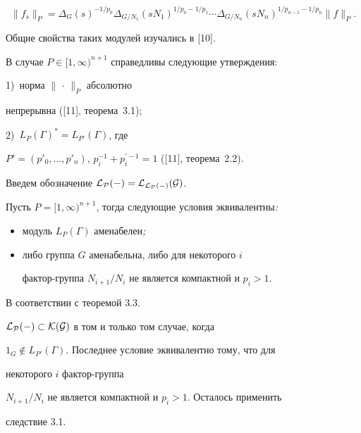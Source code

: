 $$


\|f_s\|_P=\Delta_G(s)^{-1/p_0}\Delta_{G/N_1}


(sN_1)^{1/p_0-1/p_1}\dotsb\Delta_{G/N_n}


(sN_n)^{1/p_{n-1}-1/p_n}\|f\|_P.


$$


Общие свойства таких модулей изучались в [10].





В случае $P\in[1,\infty)^{n+1}$ справедливы следующие утверждения:


1)~норма $\|\,\cdot\,\|_P$ абсолютно


непрерывна ([11], теорема~3.1);


2)~$L_P(\Gamma)^*=L_{P'}(\Gamma)$, где


$P'=(p'_0,\dotsc,p'_n)$, $p^{-1}_i+p_i^{\prime-1}=1$ ([11], теорема~2.2).





Введем обозначение $\cal L_P(\Gamma)=\cal L_{L_P(\Gamma)}(G)$.





\begin{thms}


Пусть $P=[1,\infty)^{n+1}$, тогда следующие условия эквивалентны{\em :}


\begin{itemize}


\item[1)] модуль $L_P(\Gamma)$ аменабелен{\em ;}


\item[2)] либо группа $G$ аменабельна, либо для некоторого $i$


фактор-группа $N_{i+1}/N_i$ не является компактной и $p_i>1$.


\end{itemize}


\end{thms}





\begin{pf}


В соответствии с теоремой 3.3.\;


$\cal L_P(\Gamma)\subset\cal K(G)$ в том и только том случае, когда


$1_G\notin L_{P'}(\Gamma)$. Последнее условие эквивалентно тому, что для


некоторого $i$ фактор-группа


$N_{i+1}/N_i$ не является компактной и $p_i>1$. Осталось применить


следствие 3.1.


\end{pf}





